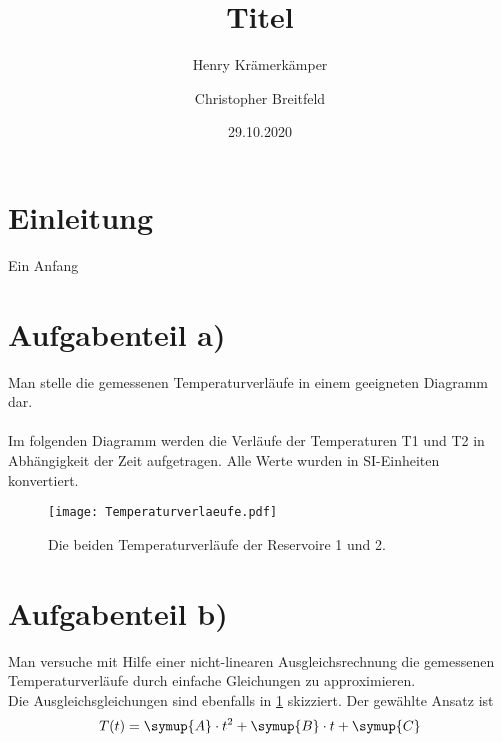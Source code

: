 \documentclass{scrartcl} %
\begin{document}
\title{Titel}
\author{Henry Krämerkämper \and Christopher Breitfeld}
\date{29.10.2020}
\maketitle
\newpage
\tableofcontents
\newpage
\section{Einleitung}
Ein Anfang
\section{Aufgabenteil a)}
  Man stelle die gemessenen Temperaturverläufe in einem geeigneten Diagramm dar. \\
  \\
  Im folgenden Diagramm werden die Verläufe der Temperaturen T1 und T2 in Abhängigkeit der Zeit aufgetragen.
  Alle Werte wurden in SI-Einheiten konvertiert.
  \\
  \begin{figure}
    \centering
    \texttt{[image: Temperaturverlaeufe.pdf]}
    \caption{Die beiden Temperaturverläufe der Reservoire 1 und 2.}
    \label{fig:TemperaturverlaufA}
  \end{figure}
\section{Aufgabenteil b)}
  Man versuche mit Hilfe einer nicht-linearen Ausgleichsrechnung die gemessenen Temperaturverläufe durch einfache Gleichungen zu approximieren.
  \\
  Die Ausgleichsgleichungen sind ebenfalls in \ref{fig:TemperaturverlaufA} skizziert. Der gewählte Ansatz ist
  \begin{equation}
    T(t) = \symup{A} \cdot t^2 + \symup{B} \cdot t + \symup{C}
    \label{eq:Regressionsgleichung}
  \end{equation}
\end{document}
